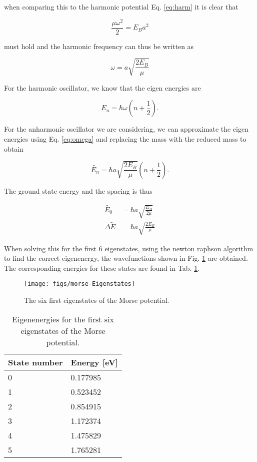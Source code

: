 when comparing this to the harmonic potential Eq. \eqref{eq:harm} it is clear that

\begin{equation*}
  \frac{\mu \omega^2}{2} = E_B a^2
\end{equation*}

must hold and the harmonic frequency can thus be written as

\begin{equation}
  \label{eq:omega}
  \omega = a \sqrt{\frac{2 E_B}{\mu}}
\end{equation}

For the harmonic oscillator, we know that the eigen energies are

\begin{equation*}
  E_n = \hbar \omega \left(n + \frac{1}{2} \right).
\end{equation*}

For the anharmonic oscillator we are considering, we can approximate the eigen energies using Eq. \eqref{eq:omega} and replacing the mass with the reduced mass to obtain

\begin{equation}
  \label{eq:enegiesMorse}
  \tilde{E_n} = \hbar a \sqrt{\frac{2 E_B}{\mu}} \left( n + \frac{1}{2}\right).
\end{equation}

The ground state energy and the spacing is thus

\begin{equation*}
  \begin{split}
    \tilde{E_0} & = \hbar a \sqrt{\frac{ E_B}{2\mu}} \\
    \Delta \tilde{E} & = \hbar a \sqrt{\frac{2 E_B}{\mu}}
  \end{split}
\end{equation*}

When solving this for the first 6 eigenstates, using the newton raphson algorithm to find the correct eigenenergy, the wavefunctions shown in Fig. \ref{fig:morse-Eigenstates} are obtained. The corresponding energies for these states are found in Tab. \ref{tab:morse-eigeneneries}.

\begin{figure}[h]
  \centering
  \texttt{[image: figs/morse-Eigenstates]}
  \caption{The six first eigenstates of the Morse potential.}
  \label{fig:morse-Eigenstates}
\end{figure}

\begin{table}[h]
\centering
  \caption{Eigenenergies for the first six eigenstates of the Morse potential.}
  \label{tab:morse-eigeneneries}
  \begin{tabular}{l|l}
    State number & Energy [eV] \\ \hline
    0 & 0.177985 \\
    1 & 0.523452 \\
    2 & 0.854915 \\
    3 & 1.172374 \\
    4 & 1.475829 \\
    5 & 1.765281
  \end{tabular}
\end{table}
